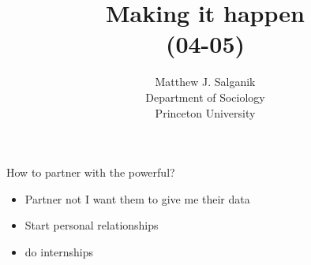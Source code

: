 \documentclass[aspectratio=169]{beamer}
\title[]{Making it happen\\(04-05)}
\author[]{Matthew J. Salganik\\Department of Sociology\\Princeton University}
\date[]{Soc 596: Computational Social Science\\Fall 2016
\vfill
\begin{flushright}
\vspace{0.6in}
\texttt{[image: figures/cc.png]}
\end{flushright}
}
\begin{document}
\frame{\titlepage}
\begin{frame}

\begin{center}
\end{center}

\end{frame}
\begin{frame}

How to partner with the powerful?

\end{frame}
\begin{frame}

\begin{itemize}
\item Partner not I want them to give me their data
\item Start personal relationships
\item do internships
\end{itemize}

\end{frame}



\begin{frame}

\begin{center}
\end{center}

\end{frame}
\end{document}
